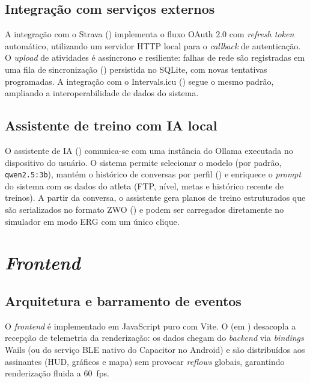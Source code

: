 \subsection{Integração com serviços externos}
\label{sec:implementacao-externos}

A integração com o Strava () implementa o fluxo
OAuth 2.0 com \textit{refresh token} automático, utilizando um servidor HTTP
local para o \textit{callback} de autenticação. O \textit{upload} de atividades
é assíncrono e resiliente: falhas de rede são registradas em uma fila de
sincronização () persistida no SQLite, com novas tentativas
programadas. A integração com o Intervals.icu
() segue o mesmo padrão, ampliando a
interoperabilidade de dados do sistema.

\subsection{Assistente de treino com IA local}
\label{sec:implementacao-ai}

O assistente de IA () comunica-se com uma instância
do Ollama \cite{ollama2024} executada no dispositivo do usuário. O sistema
permite selecionar o modelo (por padrão, \texttt{qwen2.5:3b}), mantém o
histórico de conversas por perfil () e enriquece o
\textit{prompt} do sistema com os dados do atleta (FTP, nível, metas e
histórico recente de treinos). A partir da conversa, o assistente gera planos
de treino estruturados que são serializados no formato ZWO
() e podem ser carregados diretamente no simulador em modo
ERG com um único clique.

\section{\textit{Frontend}}
\label{sec:frontend}

\subsection{Arquitetura e barramento de eventos}
\label{sec:frontend-eventbus}

O \textit{frontend} é implementado em JavaScript puro com Vite. O
 (em )
desacopla a recepção de telemetria da renderização: os dados chegam do
\textit{backend} via \textit{bindings} Wails (ou do serviço BLE nativo do
Capacitor no Android) e são distribuídos aos assinantes (HUD, gráficos e
mapa) sem provocar \textit{reflows} globais, garantindo renderização fluida
a 60~fps.

